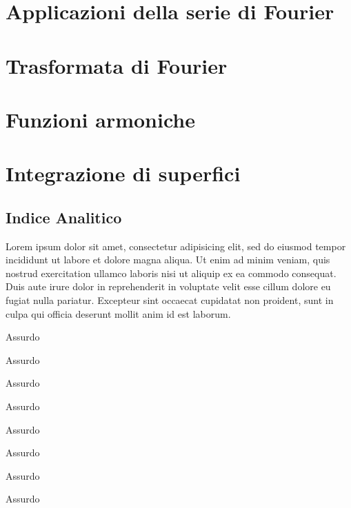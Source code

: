 \documentclass[a4paper, 11pt]{report}
\begin{document}

\chapter{Applicazioni della serie di Fourier}


\chapter{Trasformata di Fourier}


\chapter{Funzioni armoniche}


\chapter{Integrazione di superfici}


\newpage

\section{Indice Analitico}

Lorem ipsum dolor sit amet, consectetur adipisicing elit, sed do eiusmod
tempor incididunt ut labore et dolore magna aliqua. Ut enim ad minim veniam,
quis nostrud exercitation ullamco laboris nisi ut aliquip ex ea commodo
consequat. Duis aute irure dolor in reprehenderit in voluptate velit esse
cillum dolore eu fugiat nulla pariatur. Excepteur sint occaecat cupidatat non
proident, sunt in culpa qui officia deserunt mollit anim id est laborum.

\begin{multicols*}{2}

\makebox[3cm][l]{\absurd} Assurdo

\makebox[3cm][l]{\absurd} Assurdo

\makebox[3cm][l]{\absurd} Assurdo

\makebox[3cm][l]{\absurd} Assurdo

\vfill\null\columnbreak

\makebox[3cm][l]{\absurd} Assurdo

\makebox[3cm][l]{\absurd} Assurdo

\makebox[3cm][l]{\absurd} Assurdo

\makebox[3cm][l]{\absurd} Assurdo

\end{multicols*}
\end{document}
